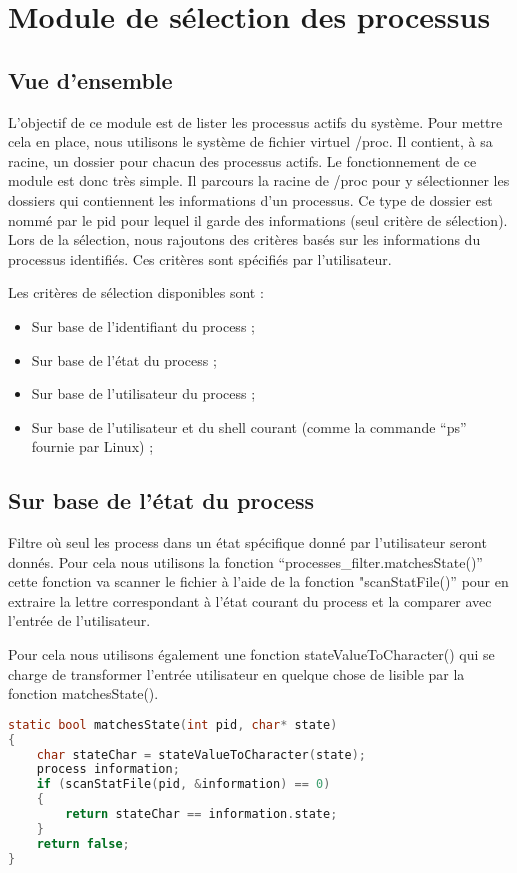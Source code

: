 \section{Module de sélection des processus}
\subsection{Vue d'ensemble}
L'objectif de ce module est de lister les processus actifs du système. Pour mettre cela en place, nous utilisons le système de fichier virtuel /proc. Il contient, à sa racine, un dossier pour chacun des processus actifs. Le fonctionnement de ce module est donc très simple. Il parcours la racine de /proc pour y sélectionner les dossiers qui contiennent les informations d'un processus. Ce type de dossier est nommé par le pid pour lequel il garde des informations (seul critère de sélection). Lors de la sélection, nous rajoutons des critères basés sur les informations du processus identifiés. Ces critères sont spécifiés par l'utilisateur.

Les critères de sélection disponibles sont :

\begin{itemize}
\item Sur base de l'identifiant du process ;
\item Sur base de l’état du process ;
\item Sur base de l’utilisateur du process ;
\item Sur base de l’utilisateur et du shell courant (comme la commande “ps” 
fournie par Linux) ;
\end{itemize}

\subsection{Sur base de l'état du process} 
Filtre où seul les process dans un état spécifique donné par l’utilisateur seront donnés. Pour cela nous utilisons la fonction “processes\_filter.matchesState()” cette fonction va scanner le fichier à l’aide de la fonction "scanStatFile()” pour en extraire la lettre correspondant à l’état courant du process et la comparer avec l’entrée de l’utilisateur.

Pour cela nous utilisons également une fonction  stateValueToCharacter() qui se charge de transformer l'entrée utilisateur en quelque chose de lisible par la fonction matchesState().

\begin{lstlisting}[frame=single, language=c]
static bool matchesState(int pid, char* state)
{
    char stateChar = stateValueToCharacter(state);
    process information;
    if (scanStatFile(pid, &information) == 0)
    {
        return stateChar == information.state;
    }
    return false;
}
\end{lstlisting}

